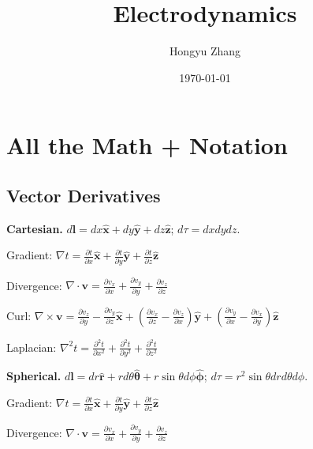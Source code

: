 \documentclass{report}
\title{Electrodynamics}
\author{Hongyu Zhang}
\date{\today}
\newcommand{\unitx}{\mathbf{\hat{x}}}
\newcommand{\unity}{\mathbf{\hat{y}}}
\newcommand{\unitz}{\mathbf{\hat{z}}}
\begin{document}
\maketitle
\renewcommand\thesection{1.\arabic{section}}
\setcounter{section}{0}
\renewcommand\theequation{1.\arabic{equation}}
\setcounter{equation}{0}
\newcommand{\Problem}{{\bf Problem: }}





\chapter{All the Math + Notation}
\section{Vector Derivatives}

\textbf{Cartesian.} $\displaystyle d\mathbf{l} = dx \mathbf{\hat{x}} + dy \mathbf{\hat{y}} + dz \mathbf{\hat{z}}$; $d\tau = dxdydz$.

\noindent Gradient: $\displaystyle \nabla t = \frac{\partial t}{\partial x}\unitx  + \frac{\partial t}{\partial y}\unity + \frac{\partial t}{\partial z}\unitz$

\noindent Divergence:  $\displaystyle \nabla \cdot \mathbf{v} = \frac{\partial v_x}{\partial x}  + \frac{\partial v_y}{\partial y} + \frac{\partial v_z}{\partial z}$

\noindent Curl: $\displaystyle \nabla \times \mathbf{v} = \frac{\partial v_z}{\partial y} - \frac{\partial v_y}{\partial z}\unitx  + \left( \frac{\partial v_x}{\partial z} - \frac{\partial v_z}{\partial x} \right)\unity + \left( \frac{\partial v_y}{\partial x} - \frac{\partial v_x}{\partial y} \right)\unitz$

\noindent Laplacian: $\displaystyle \nabla^2 t = \frac{\partial^2 t}{\partial x^2}  + \frac{\partial^2 t}{\partial y^2} + \frac{\partial^2 t}{\partial z^2}$


\vspace{1em}
\noindent \textbf{Spherical.} $\displaystyle d\mathbf{l} = dr \mathbf{\hat{r}} + r d\theta \boldsymbol{\hat{\theta}} + r \sin{\theta} d\phi \boldsymbol{\hat{\phi}}$; $d\tau = r^2 \sin{\theta} drd\theta d\phi$.

\noindent Gradient: $\displaystyle \nabla t = \frac{\partial t}{\partial x}\unitx  + \frac{\partial t}{\partial y}\unity + \frac{\partial t}{\partial z}\unitz$

\noindent Divergence:  $\displaystyle \nabla \cdot \mathbf{v} = \frac{\partial v_x}{\partial x}  + \frac{\partial v_y}{\partial y} + \frac{\partial v_z}{\partial z}$
\end{document}
